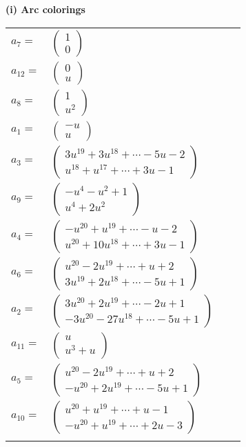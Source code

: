 \documentclass[1p]{elsarticle_modified}
\theoremstyle{definition}
\begin{document}
\flushleft \textbf{(i) Arc colorings}\\
\begin{tabular}{m{7pt} m{180pt} m{7pt} m{180pt} }
\flushright $a_{7}=$&$\begin{pmatrix}1\\0\end{pmatrix}$ \\
\flushright $a_{12}=$&$\begin{pmatrix}0\\u\end{pmatrix}$ \\
\flushright $a_{8}=$&$\begin{pmatrix}1\\u^2\end{pmatrix}$ \\
\flushright $a_{1}=$&$\begin{pmatrix}- u\\u\end{pmatrix}$ \\
\flushright $a_{3}=$&$\begin{pmatrix}3 u^{19}+3 u^{18}+\cdots-5 u-2\\u^{18}+u^{17}+\cdots+3 u-1\end{pmatrix}$ \\
\flushright $a_{9}=$&$\begin{pmatrix}- u^4- u^2+1\\u^4+2 u^2\end{pmatrix}$ \\
\flushright $a_{4}=$&$\begin{pmatrix}- u^{20}+u^{19}+\cdots- u-2\\u^{20}+10 u^{18}+\cdots+3 u-1\end{pmatrix}$ \\
\flushright $a_{6}=$&$\begin{pmatrix}u^{20}-2 u^{19}+\cdots+u+2\\3 u^{19}+2 u^{18}+\cdots-5 u+1\end{pmatrix}$ \\
\flushright $a_{2}=$&$\begin{pmatrix}3 u^{20}+2 u^{19}+\cdots-2 u+1\\-3 u^{20}-27 u^{18}+\cdots-5 u+1\end{pmatrix}$ \\
\flushright $a_{11}=$&$\begin{pmatrix}u\\u^3+u\end{pmatrix}$ \\
\flushright $a_{5}=$&$\begin{pmatrix}u^{20}-2 u^{19}+\cdots+u+2\\- u^{20}+2 u^{19}+\cdots-5 u+1\end{pmatrix}$ \\
\flushright $a_{10}=$&$\begin{pmatrix}u^{20}+u^{19}+\cdots+u-1\\- u^{20}+u^{19}+\cdots+2 u-3\end{pmatrix}$\\&\end{tabular}
\end{document}
